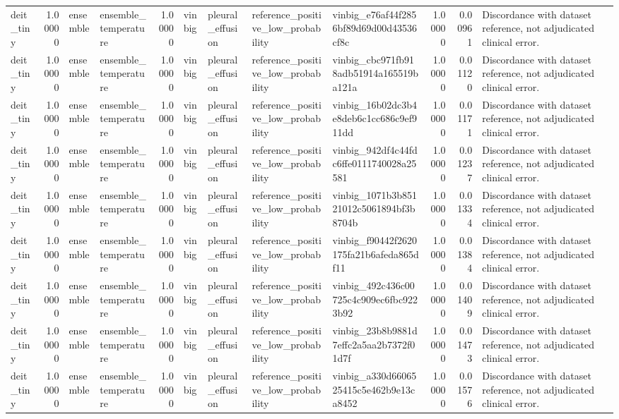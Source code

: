 \begin{tabular}{lrllrllllrrl}
deit\_tiny & 1.00000 & ensemble & ensemble\_temperature & 1.00000 & vinbig & pleural\_effusion & reference\_positive\_low\_probability & vinbig\_e76af44f2856bf89d69d00d43536cf8c & 1.00000 & 0.00961 & Discordance with dataset reference, not adjudicated clinical error. \\
deit\_tiny & 1.00000 & ensemble & ensemble\_temperature & 1.00000 & vinbig & pleural\_effusion & reference\_positive\_low\_probability & vinbig\_cbc971fb918adb51914a165519ba121a & 1.00000 & 0.01120 & Discordance with dataset reference, not adjudicated clinical error. \\
deit\_tiny & 1.00000 & ensemble & ensemble\_temperature & 1.00000 & vinbig & pleural\_effusion & reference\_positive\_low\_probability & vinbig\_16b02dc3b4e8deb6c1cc686c9ef911dd & 1.00000 & 0.01171 & Discordance with dataset reference, not adjudicated clinical error. \\
deit\_tiny & 1.00000 & ensemble & ensemble\_temperature & 1.00000 & vinbig & pleural\_effusion & reference\_positive\_low\_probability & vinbig\_942df4c44fdc6ffe0111740028a25581 & 1.00000 & 0.01237 & Discordance with dataset reference, not adjudicated clinical error. \\
deit\_tiny & 1.00000 & ensemble & ensemble\_temperature & 1.00000 & vinbig & pleural\_effusion & reference\_positive\_low\_probability & vinbig\_1071b3b85121012c5061894bf3b8704b & 1.00000 & 0.01334 & Discordance with dataset reference, not adjudicated clinical error. \\
deit\_tiny & 1.00000 & ensemble & ensemble\_temperature & 1.00000 & vinbig & pleural\_effusion & reference\_positive\_low\_probability & vinbig\_f90442f2620175fa21b6afeda865df11 & 1.00000 & 0.01384 & Discordance with dataset reference, not adjudicated clinical error. \\
deit\_tiny & 1.00000 & ensemble & ensemble\_temperature & 1.00000 & vinbig & pleural\_effusion & reference\_positive\_low\_probability & vinbig\_492c436c00725c4c909ec6fbc9223b92 & 1.00000 & 0.01409 & Discordance with dataset reference, not adjudicated clinical error. \\
deit\_tiny & 1.00000 & ensemble & ensemble\_temperature & 1.00000 & vinbig & pleural\_effusion & reference\_positive\_low\_probability & vinbig\_23b8b9881d7effc2a5aa2b7372f01d7f & 1.00000 & 0.01473 & Discordance with dataset reference, not adjudicated clinical error. \\
deit\_tiny & 1.00000 & ensemble & ensemble\_temperature & 1.00000 & vinbig & pleural\_effusion & reference\_positive\_low\_probability & vinbig\_a330d6606525415c5e462b9e13ca8452 & 1.00000 & 0.01576 & Discordance with dataset reference, not adjudicated clinical error. \\

\end{tabular}
